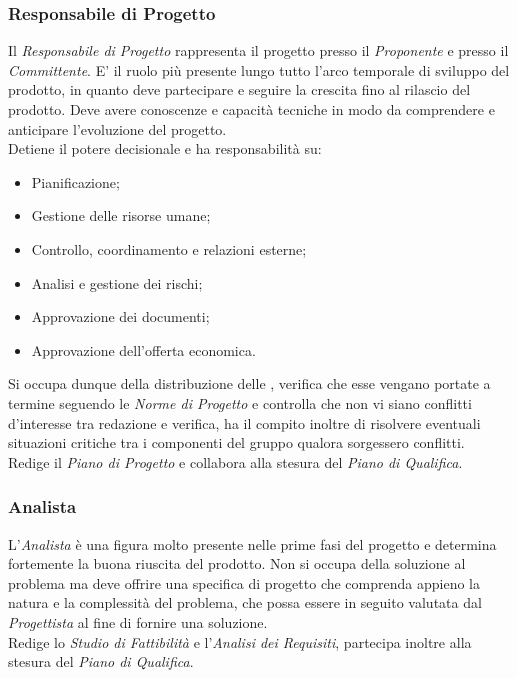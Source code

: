 \documentclass{scalatekids-article}
\begin{document}
\subsubsection{Responsabile di Progetto}

Il \textit{Responsabile di Progetto} rappresenta il progetto presso il \textit{Proponente}
e presso il \textit{Committente}. E' il ruolo più presente lungo tutto l'arco temporale di
sviluppo del prodotto, in quanto deve partecipare e seguire la
crescita fino al rilascio del prodotto. Deve avere conoscenze e capacità
tecniche in modo da comprendere e anticipare l'evoluzione del progetto.\\
Detiene il potere decisionale e ha responsabilità su:
\begin{itemize}
    \item Pianificazione;
    \item Gestione delle risorse umane;
    \item Controllo, coordinamento e relazioni esterne;
    \item Analisi e gestione dei rischi;
    \item Approvazione dei documenti;
    \item Approvazione dell'offerta economica.
\end{itemize}
Si occupa dunque della distribuzione delle , verifica che esse vengano
portate a termine seguendo le \textit{Norme di Progetto} e controlla che non vi
siano conflitti d'interesse tra redazione e verifica, ha il compito inoltre di
risolvere eventuali situazioni critiche tra i componenti del gruppo qualora
sorgessero conflitti.\\ Redige il \textit{Piano di Progetto} e collabora alla
stesura del \textit{Piano di Qualifica}.

\subsubsection{Analista}

L'\textit{Analista} è una figura molto presente nelle prime fasi del progetto e
determina fortemente la buona riuscita del prodotto. Non si occupa della
soluzione al problema ma deve offrire una specifica di progetto che comprenda
appieno la natura e la complessità del problema, che possa essere in seguito
valutata dal \textit{Progettista} al fine di fornire una soluzione.\\ Redige lo
\textit{Studio di Fattibilità} e l'\textit{Analisi dei Requisiti}, partecipa
inoltre alla stesura del \textit{Piano di Qualifica}.
\end{document}
